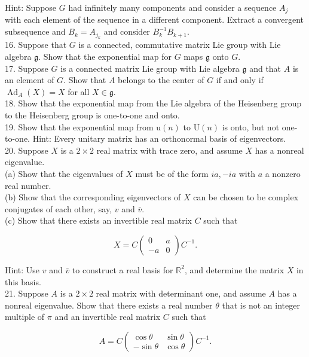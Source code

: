\documentclass[10pt, letterpaper]{article}
\begin{document}
Hint: Suppose $G$ had infinitely many components and consider a sequence $A_{j}$ with each element of the sequence in a different component. Extract a convergent subsequence and $B_{k}=A_{j_{k}}$ and consider $B_{k}^{-1} B_{k+1}$.\\
16. Suppose that $G$ is a connected, commutative matrix Lie group with Lie algebra $\mathfrak{g}$. Show that the exponential map for $G$ maps $\mathfrak{g}$ onto $G$.\\
17. Suppose $G$ is a connected matrix Lie group with Lie algebra $\mathfrak{g}$ and that $A$ is an element of $G$. Show that $A$ belongs to the center of $G$ if and only if $\operatorname{Ad}_{A}(X)= X$ for all $X \in \mathfrak{g}$.\\
18. Show that the exponential map from the Lie algebra of the Heisenberg group to the Heisenberg group is one-to-one and onto.\\
19. Show that the exponential map from $\mathrm{u}(n)$ to $\mathrm{U}(n)$ is onto, but not one-to-one. Hint: Every unitary matrix has an orthonormal basis of eigenvectors.\\
20. Suppose $X$ is a $2 \times 2$ real matrix with trace zero, and assume $X$ has a nonreal eigenvalue.\\
(a) Show that the eigenvalues of $X$ must be of the form $i a,-i a$ with $a$ a nonzero real number.\\
(b) Show that the corresponding eigenvectors of $X$ can be chosen to be complex conjugates of each other, say, $v$ and $\bar{v}$.\\
(c) Show that there exists an invertible real matrix $C$ such that

$$
X=C\left(\begin{array}{rr}
0 & a \\
-a & 0
\end{array}\right) C^{-1} .
$$

Hint: Use $v$ and $\bar{v}$ to construct a real basis for $\mathbb{R}^{2}$, and determine the matrix $X$ in this basis.\\
21. Suppose $A$ is a $2 \times 2$ real matrix with determinant one, and assume $A$ has a nonreal eigenvalue. Show that there exists a real number $\theta$ that is not an integer multiple of $\pi$ and an invertible real matrix $C$ such that

$$
A=C\left(\begin{array}{rr}
\cos \theta & \sin \theta \\
-\sin \theta & \cos \theta
\end{array}\right) C^{-1} .
$$
\end{document}
